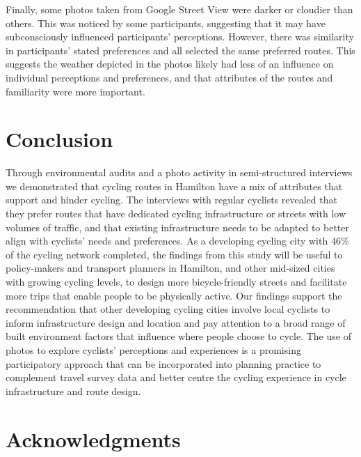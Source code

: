 \documentclass[]{elsarticle} %
\begin{document}
Finally, some photos taken from Google Street View were darker or
cloudier than others. This was noticed by some participants, suggesting
that it may have subconsciously influenced participants' perceptions.
However, there was similarity in participants' stated preferences and
all selected the same preferred routes. This suggests the weather
depicted in the photos likely had less of an influence on individual
perceptions and preferences, and that attributes of the routes and
familiarity were more important.

\hypertarget{sec:conclusion}{%
\section{Conclusion}\label{sec:conclusion}}

Through environmental audits and a photo activity in semi-structured
interviews we demonstrated that cycling routes in Hamilton have a mix of
attributes that support and hinder cycling. The interviews with regular
cyclists revealed that they prefer routes that have dedicated cycling
infrastructure or streets with low volumes of traffic, and that existing
infrastructure needs to be adapted to better align with cyclists' needs
and preferences. As a developing cycling city with 46\% of the cycling
network completed, the findings from this study will be useful to
policy-makers and transport planners in Hamilton, and other mid-sized
cities with growing cycling levels, to design more bicycle-friendly
streets and facilitate more trips that enable people to be physically
active. Our findings support the recommendation that other developing
cycling cities involve local cyclists to inform infrastructure design
and location and pay attention to a broad range of built environment
factors that influence where people choose to cycle. The use of photos
to explore cyclists' perceptions and experiences is a promising
participatory approach that can be incorporated into planning practice
to complement travel survey data and better centre the cycling
experience in cycle infrastructure and route design.

\hypertarget{sec:acknowledgments}{%
\section{Acknowledgments}\label{sec:acknowledgments}}
\end{document}
